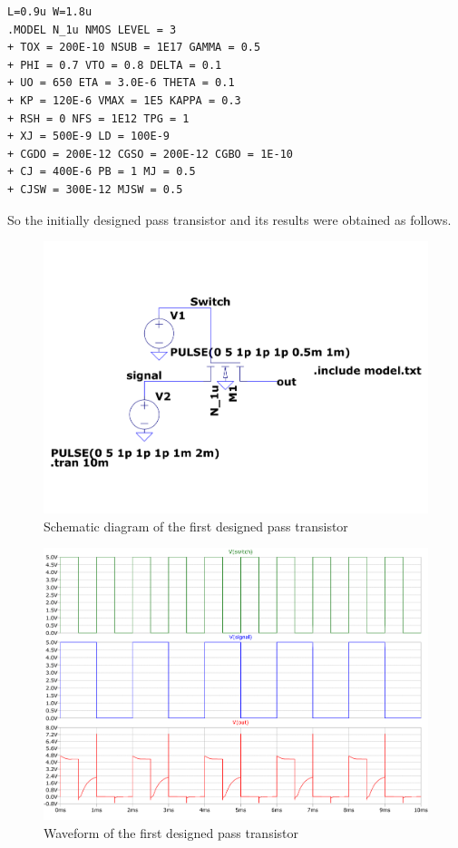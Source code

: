 \documentclass[a4paper,11pt]{article}%
\begin{document}
\begin{verbatim}
L=0.9u W=1.8u
.MODEL N_1u NMOS LEVEL = 3
+ TOX = 200E-10 NSUB = 1E17 GAMMA = 0.5
+ PHI = 0.7 VTO = 0.8 DELTA = 0.1
+ UO = 650 ETA = 3.0E-6 THETA = 0.1
+ KP = 120E-6 VMAX = 1E5 KAPPA = 0.3
+ RSH = 0 NFS = 1E12 TPG = 1
+ XJ = 500E-9 LD = 100E-9
+ CGDO = 200E-12 CGSO = 200E-12 CGBO = 1E-10
+ CJ = 400E-6 PB = 1 MJ = 0.5
+ CJSW = 300E-12 MJSW = 0.5
\end{verbatim}

So the initially designed pass transistor and its results were obtained as follows.
\begin{figure}[H]
	\centering
	\includegraphics[scale=0.4]{figures/2part2/without_res_cct.pdf}
	\caption{Schematic diagram of the first designed pass transistor}
\end{figure}
\begin{figure}[H]
	\centering
	\includegraphics[scale=0.5]{figures/2part2/without_res_wave.pdf}
	\caption{Waveform of the first designed pass transistor}
\end{figure}
\end{document}
